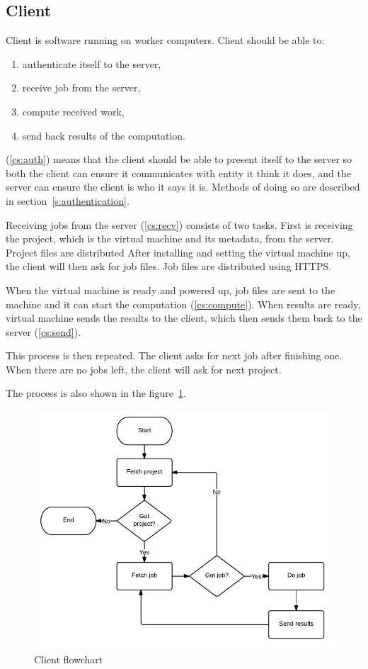 \subsection{Client}

Client is software running on worker computers. Client should be able to:
\begin{enumerate}
	\item \label{cs:auth} authenticate itself to the server,
	\item \label{cs:recv} receive job from the server,
	\item \label{cs:compute} compute received work,
	\item \label{cs:send} send back results of the computation.
\end{enumerate}

(\ref{cs:auth}) means that the client should be able to present itself to the server so both the client can ensure it communicates with entity it think it does, and the server can ensure the client is who it says it is. Methods of doing so are described in section~\ref{s:authentication}.

Receiving jobs from the server (\ref{cs:recv}) consists of two tasks. First is receiving the project, which is the virtual machine and its metadata, from the server. Project files are distributed  After installing and setting the virtual machine up, the client will then ask for job files. Job files are distributed using HTTPS.

When the virtual machine is ready and powered up, job files are sent to the machine and it can start the computation (\ref{cs:compute}). When results are ready, virtual machine sends the results to the client, which then sends them back to the server (\ref{cs:send}).

This process is then repeated. The client asks for next job after finishing one. When there are no jobs left, the client will ask for next project.

The process is also shown in the figure~\ref{f:clientflow}.

\begin{figure}
\centering
\includegraphics{diagrams/ClientFlowchart.pdf}
\caption{Client flowchart}
\label{f:clientflow}
\end{figure}

